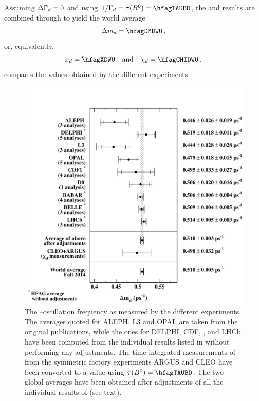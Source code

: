 Assuming $\Delta\Gamma_{d}=0$ 
and using $1/\Gd=\tau(\Bd)=\hfagTAUBD$,
the \dmd and \chid results are combined through  
to yield the 
world average
\begin{equation} 
\dmd = \hfagDMDWU \,,
\labe{dmd}
\end{equation} 
or, equivalently,
\begin{equation} 
\xd= \hfagXDWU ~~~ \mbox{and} ~~~ \chid=\hfagCHIDWU \,.  
\labe{chid}
\end{equation}
 compares the \dmd values obtained by the different experiments.

\begin{figure}
\begin{center}
\includegraphics[width=\textwidth]{figures/life_mix/dmd_expt_bw}
\caption{The \Bd--\Bdbar oscillation frequency \dmd as measured by the different experiments. 
The averages quoted for ALEPH, L3 and OPAL are taken from the original publications, while the 
ones for DELPHI, CDF, \babar, \belle and LHCb have been computed from the individual results 
listed in  without performing any adjustments. The time-integrated measurements 
of \chid from the symmetric \B factory experiments ARGUS and CLEO have been converted 
to a \dmd value using $\tau(\Bd)=\hfagTAUBD$. The two global averages have been obtained 
after adjustments of all the individual \dmd results of  (see text).}
\end{center}
\end{figure}

